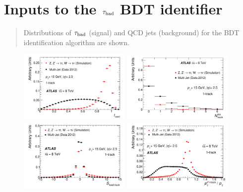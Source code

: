 \chapter[Inputs to the $\tauh$ BDT identifier][Inputs to the $\tauh$ BDT identifier]{Inputs to the $\tauh$ BDT identifier}
\label{apx:tauid}

\begin{quote}
Distributions of $\tauh$ (signal) and QCD jets (background) for the BDT identification algorithm are shown.
\end{quote}

\begin{figure}[tp]
  \centering
  \includegraphics[width=0.48\textwidth]{figures/PERF-2013-06/fig_02a}
  \includegraphics[width=0.48\textwidth]{figures/PERF-2013-06/fig_02b}
  \includegraphics[width=0.48\textwidth]{figures/PERF-2013-06/figaux_01}
  \includegraphics[width=0.48\textwidth]{figures/PERF-2013-06/figaux_02}

\end{figure}
